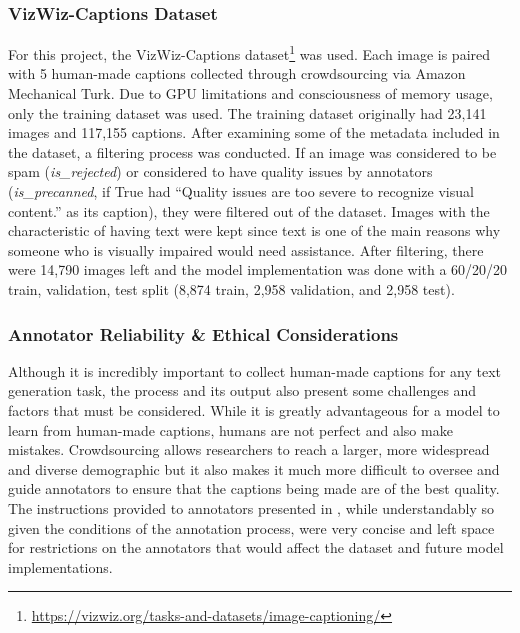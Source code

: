 \documentclass[11pt,a4paper]{article}
\begin{document}
\subsubsection{VizWiz-Captions Dataset}
\label{sssec:vizwiz-captions}
For this project, the VizWiz-Captions dataset\footnote{\url{https://vizwiz.org/tasks-and-datasets/image-captioning/}} was used. Each image is paired with 5 human-made captions collected through crowdsourcing via Amazon Mechanical Turk. Due to GPU limitations and consciousness of memory usage, only the training dataset was used. The training dataset originally had 23,141 images and 117,155 captions. After examining some of the metadata included in the dataset, a filtering process was conducted. If an image was considered to be spam (\emph{is\_rejected}) or considered to have quality issues by annotators (\emph{is\_precanned}, if True had “Quality issues are too severe to recognize visual content.” as its caption), they were filtered out of the dataset. Images with the characteristic of having text were kept since text is one of the main reasons why someone who is visually impaired would need assistance. After filtering, there were 14,790 images left and the model implementation was done with a 60/20/20 train, validation, test split (8,874 train, 2,958 validation, and 2,958 test).

\subsubsection{Annotator Reliability \& Ethical Considerations}
\label{sssec:annotatorsNethics}
Although it is incredibly important to collect human-made captions for any text generation task, the process and its output also present some challenges and factors that must be considered. While it is greatly advantageous for a model to learn from human-made captions, humans are not perfect and also make mistakes. Crowdsourcing allows researchers to reach a larger, more widespread and diverse demographic but it also makes it much more difficult to oversee and guide annotators to ensure that the captions being made are of the best quality. The instructions provided to annotators presented in \citet{Gurari-2020-captioning}, while understandably so given the conditions of the annotation process, were very concise and left space for restrictions on the annotators that would affect the dataset and future model implementations.  
\end{document}
